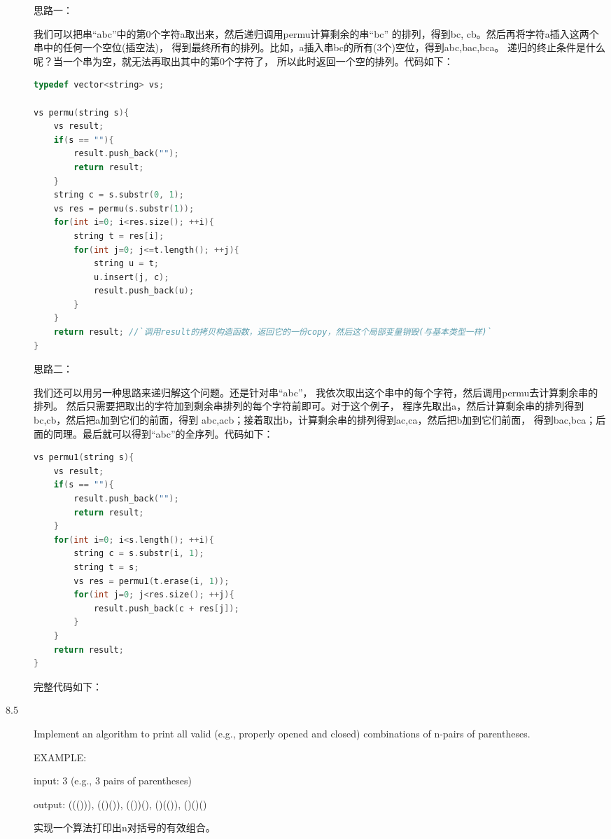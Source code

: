 \begin{description}
思路一：

我们可以把串“abc”中的第0个字符a取出来，然后递归调用permu计算剩余的串“bc” 的排列，得到{bc, cb}。然后再将字符a插入这两个串中的任何一个空位(插空法)， 得到最终所有的排列。比如，a插入串bc的所有(3个)空位，得到{abc,bac,bca}。 递归的终止条件是什么呢？当一个串为空，就无法再取出其中的第0个字符了， 所以此时返回一个空的排列。代码如下：
\begin{lstlisting}[language=C++]
typedef vector<string> vs;

vs permu(string s){
    vs result;
    if(s == ""){
        result.push_back("");
        return result;
    }
    string c = s.substr(0, 1);
    vs res = permu(s.substr(1));
    for(int i=0; i<res.size(); ++i){
        string t = res[i];
        for(int j=0; j<=t.length(); ++j){
            string u = t;
            u.insert(j, c);
            result.push_back(u);
        }
    }
    return result; //`调用result的拷贝构造函数，返回它的一份copy，然后这个局部变量销毁(与基本类型一样)`
}
\end{lstlisting}
思路二：

我们还可以用另一种思路来递归解这个问题。还是针对串“abc”， 我依次取出这个串中的每个字符，然后调用permu去计算剩余串的排列。 然后只需要把取出的字符加到剩余串排列的每个字符前即可。对于这个例子， 程序先取出a，然后计算剩余串的排列得到{bc,cb}，然后把a加到它们的前面，得到 {abc,acb}；接着取出b，计算剩余串的排列得到{ac,ca}，然后把b加到它们前面， 得到{bac,bca}；后面的同理。最后就可以得到“abc”的全序列。代码如下：
\begin{lstlisting}[language=C++]
vs permu1(string s){
    vs result;
    if(s == ""){
        result.push_back("");
        return result;
    }
    for(int i=0; i<s.length(); ++i){
        string c = s.substr(i, 1);
        string t = s;
        vs res = permu1(t.erase(i, 1));
        for(int j=0; j<res.size(); ++j){
            result.push_back(c + res[j]);
        }
    }
    return result;
}
\end{lstlisting}
完整代码如下：



\item[8.5] Implement an algorithm to print all valid (e.g., properly opened and closed) combinations of n-pairs of parentheses.

EXAMPLE:

input: 3 (e.g., 3 pairs of parentheses)

output: ((())), (()()), (())(), ()(()), ()()()

实现一个算法打印出n对括号的有效组合。


\end{description}
